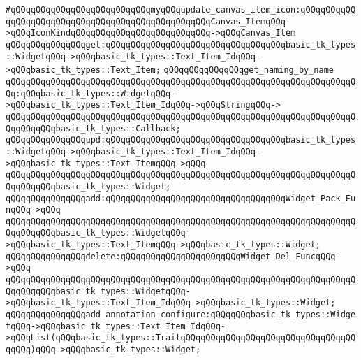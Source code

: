 \verb|#qQQqqQQqqQQqqQQqqQQqqQQqqQQqmyqQQqupdate_canvas_item_icon:qQQqqQQqqQQqqQQqqQQqqQQqqQQqqQQqqQQqqQQqqQQqqQQqqQQqCanvas_ItemqQQq->qQQqIconKindqQQqqQQqqQQqqQQqqQQqqQQqqQQq->qQQqCanvas_Item|\newline
\newline
\newline
\newline
\verb|qQQqqQQqqQQqqQQqget:qQQqqQQqqQQqqQQqqQQqqQQqqQQqqQQqqQQqbasic_tk_types::WidgetqQQq->qQQqbasic_tk_types::Text_Item_IdqQQq->qQQqbasic_tk_types::Text_Item;|\newline
\verb|qQQqqQQqqQQqqQQqget_naming_by_name|\newline
\verb|qQQqqQQqqQQqqQQqqQQqqQQqqQQqqQQqqQQqqQQqqQQqqQQqqQQqqQQqqQQqqQQqqQQqqQQq:qQQqbasic_tk_types::WidgetqQQq->qQQqbasic_tk_types::Text_Item_IdqQQq->qQQqStringqQQq->|\newline
\verb|qQQqqQQqqQQqqQQqqQQqqQQqqQQqqQQqqQQqqQQqqQQqqQQqqQQqqQQqqQQqqQQqqQQqqQQqqQQqqQQqbasic_tk_types::Callback;|\newline
\newline
\verb|qQQqqQQqqQQqqQQqupd:qQQqqQQqqQQqqQQqqQQqqQQqqQQqqQQqqQQqbasic_tk_types::WidgetqQQq->qQQqbasic_tk_types::Text_Item_IdqQQq->qQQqbasic_tk_types::Text_ItemqQQq->qQQq|\newline
\verb|qQQqqQQqqQQqqQQqqQQqqQQqqQQqqQQqqQQqqQQqqQQqqQQqqQQqqQQqqQQqqQQqqQQqqQQqqQQqqQQqbasic_tk_types::Widget;|\newline
\newline
\verb|qQQqqQQqqQQqqQQqadd:qQQqqQQqqQQqqQQqqQQqqQQqqQQqqQQqqQQqWidget_Pack_FunqQQq->qQQq|\newline
\verb|qQQqqQQqqQQqqQQqqQQqqQQqqQQqqQQqqQQqqQQqqQQqqQQqqQQqqQQqqQQqqQQqqQQqqQQqqQQqqQQqbasic_tk_types::WidgetqQQq->qQQqbasic_tk_types::Text_ItemqQQq->qQQqbasic_tk_types::Widget;|\newline
\verb|qQQqqQQqqQQqqQQqdelete:qQQqqQQqqQQqqQQqqQQqqQQqWidget_Del_FuncqQQq->qQQq|\newline
\verb|qQQqqQQqqQQqqQQqqQQqqQQqqQQqqQQqqQQqqQQqqQQqqQQqqQQqqQQqqQQqqQQqqQQqqQQqqQQqqQQqbasic_tk_types::WidgetqQQq->qQQqbasic_tk_types::Text_Item_IdqQQq->qQQqbasic_tk_types::Widget;|\newline
\newline
\newline
\verb|qQQqqQQqqQQqqQQqadd_annotation_configure:qQQqqQQqbasic_tk_types::WidgetqQQq->qQQqbasic_tk_types::Text_Item_IdqQQq->qQQqList(qQQqbasic_tk_types::TraitqQQqqQQqqQQqqQQqqQQqqQQqqQQqqQQqqQQqqQQq)qQQq->qQQqbasic_tk_types::Widget;|\newline
